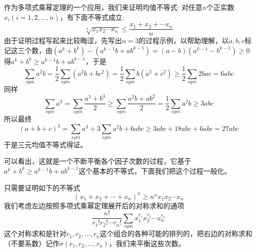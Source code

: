 \begin{example}[均值不等式]
  作为多项式乘幂定理的一个应用，我们来证明均值不等式: 对任意$n$个正实数$x_i(i=1,2,\ldots,n)$，有下面不等式成立:
  \begin{equation*}
    \sqrt[n]{x_1x_2\cdots x_n} \leqslant \frac{x_1+x_2+\cdots x_n}{n}
  \end{equation*}
  由于证明过程写起来比较晦涩，先写出$n=3$的过程示例，以帮助理解，以$a,b,c$标记这三个数，由$(a^k+b^k)-(a^{k-1}b+ab^{k-1})=(a-b)(a^{k-1}-b^{k-1}) \geqslant 0$得$a^k+b^k \geqslant a^{k-1}b+ab^{k-1}$，于是
  \begin{equation*}
    \sum_{sym}a^2b = \frac{1}{2}\sum_{sym}(a^2b+bc^2) = \frac{1}{2} \sum_{sym}b(a^2+c^2) \geqslant \frac{1}{2}\sum_{sym}2bac = 6abc
  \end{equation*}
  同样
  \begin{equation*}
    \sum_{sym}a^3 = \sum_{sym}\frac{a^3+b^3}{2} \geqslant \sum_{sym}\frac{a^2b+ab^2}{2}=\frac{1}{2}\sum_{sym}a^2b \geqslant 3abc
  \end{equation*}
  所以最终
  \begin{equation*}
    (a+b+c)^3=\sum_{sym}a^3+3\sum_{sym}a^2b+6abc \geqslant 3abc+18abc+6abc=27abc
  \end{equation*}
  于是三元均值不等式得证。

  可以看出，这就是一个不断平衡各个因子次数的过程，它基于$a^k+b^k\geqslant a^{k-1}b+ab^{k-1}$这个基本的不等式，下面我们把这个过程一般化。

  只需要证明如下的不等式
  \begin{equation*}
    (x_1+x_2+\cdots+x_n)^n \geqslant n^n x_1x_2\cdots x_n
  \end{equation*}
  我们考虑左边按照多项式乘幂定理展开后的对称求和的通项
  \begin{equation*}
    \frac{n!}{r_1!r_2!\cdots r_n!}\sum_{sym}x_1^{r_1}x_2^{r_2}\cdots x_n^{r_n}
  \end{equation*}
  这个对称求和是针对$r_1,r_2,\ldots,r_n$这个组合的各种可能的排列的，把右边的对称求和（不要系数）记作$\sigma(r_1,r_2,\ldots,r_n)$，我们来平衡这些次数。


\end{example}
